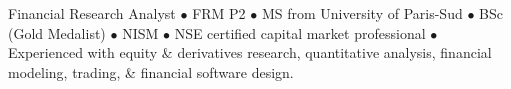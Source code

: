 %
%
%
\par{
Financial Research Analyst $\bullet$ FRM P2 $\bullet$ MS from University of Paris-Sud $\bullet$ BSc (Gold Medalist) $\bullet$ NISM $\bullet$ NSE certified capital market professional $\bullet$ Experienced with equity \& derivatives research, quantitative analysis, financial modeling, trading, \& financial software design.



}